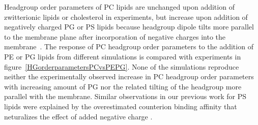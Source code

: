 \documentclass[journal=jpcbfk]{achemso}
\begin{document}
Headgroup order parameters of PC lipids are unchanged upon addition
of zwitterionic lipids or cholesterol in experiments, but increase
upon addition of negatively charged PG or PS lipids because
headgroup dipole tilts more parallel to the membrane plane after incorporation
of negative charges into the membrane~\cite{seelig87, scherer87,antila18}.
The response of PC headgroup order parameters to the addition of PE or PG lipids
from different simulations is compared with experiments in figure~\ref{HGorderparametersPCvsPEPG}.
%
%
%
%
None of the simulations reproduce neither the experimentally observed increase in PC headgroup order parameters
with increasing amount of PG nor the related tilting of the headgroup more parallel with the membrane.
Similar observations in our previous work for PS lipids were explained by the overestimated counterion
binding affinity that neturalizes the effect of added negative charge \cite{antila19}.
\end{document}
